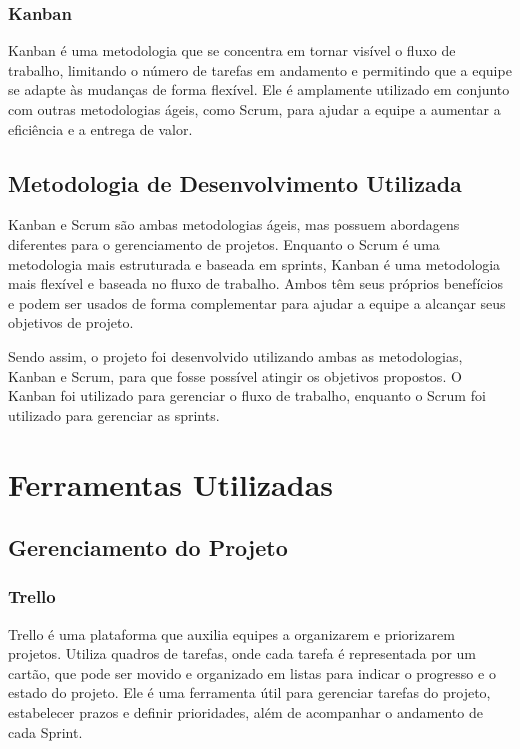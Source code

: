\subsubsection{Kanban}

Kanban é uma metodologia que se concentra em tornar visível o fluxo de trabalho, limitando o número de tarefas em andamento e permitindo que a equipe se adapte às mudanças de forma flexível. Ele é amplamente utilizado em conjunto com outras metodologias ágeis, como Scrum, para ajudar a equipe a aumentar a eficiência e a entrega de valor. \cite{Lage2008}

\subsection{Metodologia de Desenvolvimento Utilizada}

Kanban e Scrum são ambas metodologias ágeis, mas possuem abordagens diferentes para o gerenciamento de projetos. Enquanto o Scrum é uma metodologia mais estruturada e baseada em sprints, Kanban é uma metodologia mais flexível e baseada no fluxo de trabalho. Ambos têm seus próprios benefícios e podem ser usados de forma complementar para ajudar a equipe a alcançar seus objetivos de projeto. \cite{Kniberg2010}

Sendo assim, o projeto foi desenvolvido utilizando ambas as metodologias, Kanban e Scrum, para que fosse possível atingir os objetivos propostos. O Kanban foi utilizado para gerenciar o fluxo de trabalho, enquanto o Scrum foi utilizado para gerenciar as sprints.

\section{Ferramentas Utilizadas}

\subsection{Gerenciamento do Projeto}

\subsubsection{Trello}

Trello é uma plataforma que auxilia equipes a organizarem e priorizarem projetos. Utiliza quadros de tarefas, onde cada tarefa é representada por um cartão, que pode ser movido e organizado em listas para indicar o progresso e o estado do projeto. Ele é uma ferramenta útil para gerenciar tarefas do projeto, estabelecer prazos e definir prioridades, além de acompanhar o andamento de cada Sprint.

